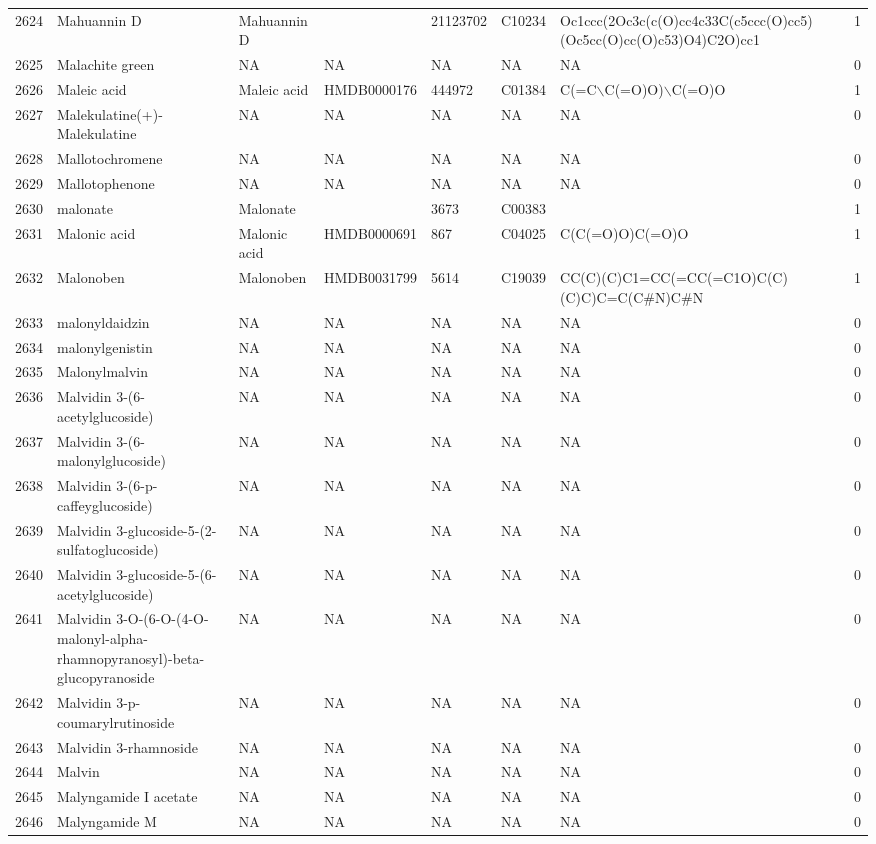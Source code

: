 \documentclass[a4paper]{article}
\begin{document}
\begin{longtable}{rlllllll}
  2624 & Mahuannin D & Mahuannin D &  & 21123702 & C10234 & Oc1ccc(2Oc3c(c(O)cc4c33C(c5ccc(O)cc5)(Oc5cc(O)cc(O)c53)O4)C2O)cc1 & 1 \\ 
  2625 & Malachite green & NA & NA & NA & NA & NA & 0 \\ 
  2626 & Maleic acid & Maleic acid & HMDB0000176 & 444972 & C01384 & C(=C$\backslash$C(=O)O)$\backslash$C(=O)O & 1 \\ 
  2627 & Malekulatine(+)-Malekulatine & NA & NA & NA & NA & NA & 0 \\ 
  2628 & Mallotochromene & NA & NA & NA & NA & NA & 0 \\ 
  2629 & Mallotophenone & NA & NA & NA & NA & NA & 0 \\ 
  2630 & malonate & Malonate &  & 3673 & C00383 &  & 1 \\ 
  2631 & Malonic acid & Malonic acid & HMDB0000691 & 867 & C04025 & C(C(=O)O)C(=O)O & 1 \\ 
  2632 & Malonoben & Malonoben & HMDB0031799 & 5614 & C19039 & CC(C)(C)C1=CC(=CC(=C1O)C(C)(C)C)C=C(C\#N)C\#N & 1 \\ 
  2633 & malonyldaidzin & NA & NA & NA & NA & NA & 0 \\ 
  2634 & malonylgenistin & NA & NA & NA & NA & NA & 0 \\ 
  2635 & Malonylmalvin & NA & NA & NA & NA & NA & 0 \\ 
  2636 & Malvidin 3-(6-acetylglucoside) & NA & NA & NA & NA & NA & 0 \\ 
  2637 & Malvidin 3-(6-malonylglucoside) & NA & NA & NA & NA & NA & 0 \\ 
  2638 & Malvidin 3-(6-p-caffeyglucoside) & NA & NA & NA & NA & NA & 0 \\ 
  2639 & Malvidin 3-glucoside-5-(2-sulfatoglucoside) & NA & NA & NA & NA & NA & 0 \\ 
  2640 & Malvidin 3-glucoside-5-(6-acetylglucoside) & NA & NA & NA & NA & NA & 0 \\ 
  2641 & Malvidin 3-O-(6-O-(4-O-malonyl-alpha-rhamnopyranosyl)-beta-glucopyranoside & NA & NA & NA & NA & NA & 0 \\ 
  2642 & Malvidin 3-p-coumarylrutinoside & NA & NA & NA & NA & NA & 0 \\ 
  2643 & Malvidin 3-rhamnoside & NA & NA & NA & NA & NA & 0 \\ 
  2644 & Malvin & NA & NA & NA & NA & NA & 0 \\ 
  2645 & Malyngamide I acetate & NA & NA & NA & NA & NA & 0 \\ 
  2646 & Malyngamide M & NA & NA & NA & NA & NA & 0 \\ 

\end{longtable}
\end{document}
